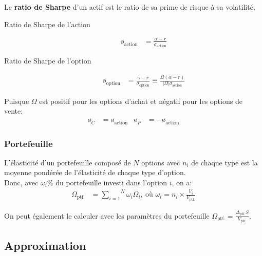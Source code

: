 \documentclass[10pt, french]{article}
\begin{document}
\begin{multicols*}{2}
\begin{definitionNOHFILL}
Le \textbf{ratio de Sharpe} d'un actif est le ratio de sa prime de risque à sa volatilité.
\begin{description}
	\item[Ratio de Sharpe de l'action]	
		\begin{align*}
		\text{\o}_{\text{action}}	
		&=	\frac{\alpha - r}{\sigma_{\text{action}}}
		\end{align*}
	\item[Ratio de Sharpe de l'option]	
		\begin{align*}
		\text{\o}_{\text{option}}	
		&=	\frac{\gamma - r}{\sigma_{\text{option}}}	
		\equiv	\frac{\Omega (\alpha - r)}{|\Omega|\sigma_{\text{action}}}	
		\end{align*}
\end{description}
Puisque $\Omega$ est positif pour les options d'achat et négatif pour les options de vente:
\begin{align*}
	\text{\o}_{C}	&=	\text{\o}_{\text{action}}	&
	\text{\o}_{P}	&=	-\text{\o}_{\text{action}}
\end{align*}
\end{definitionNOHFILL}

\subsubsection*{Portefeuille}

L'élasticité d'un portefeuille composé de $N$ options avec $n_{i}$ de chaque type est la moyenne pondérée de l'élasticité de chaque type d'option.\\
Donc, avec $\omega_{i}$\% du portefeuille investi dans l'option $i$, on a:
\begin{align*}
	\Omega_{\text{ptf.}}
	&=	\overset{N}{\underset{i = 1}{\sum}} \omega_{i} \Omega_{i}, \: \text{où } \omega_{i} = n_{i} \times \frac{V_{i}}{V_{\text{ptf.}}}
\end{align*}

On peut également le calculer avec les paramètres du portefeuille $\Omega_{\text{ptf.}} = \frac{\Delta_{\text{ptf.}}S}{V_{\text{ptf.}}}$.

\subsection{Approximation}


\end{multicols*}
\end{document}
